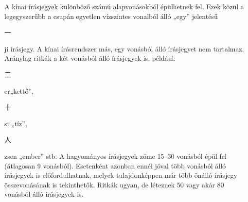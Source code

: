 A kínai írásjegyek különböző számú alapvonásokból épülhetnek fel. Ezek közül a legegyszerűbb a csupán egyetlen vízszintes vonalból álló „egy” jelentésű \begin{CJK*}{UTF8}{gbsn}
一
\end{CJK*} ji írásjegy. A kínai írásrendszer más, egy vonásból álló írásjegyet nem tartalmaz. Aránylag ritkák a két vonásból álló írásjegyek is, például: \begin{CJK*}{UTF8}{gbsn}
二
\end{CJK*} er„kettő”,
\begin{CJK*}{UTF8}{gbsn}
十
\end{CJK*} si „tíz”,
\begin{CJK*}{UTF8}{gbsn}
人
\end{CJK*} zsen „ember” stb. A hagyományos írásjegyek zöme 15–30 vonásból épül fel (átlagosan 9 vonásból). Esetenként azonban ennél jóval több vonásból álló írásjegyek is előfordulhatnak, melyek tulajdonképpen már több önálló írásjegy összevonásának is tekinthetők. Ritkák ugyan, de léteznek 50 vagy akár 80 vonásból álló írásjegyek is.

